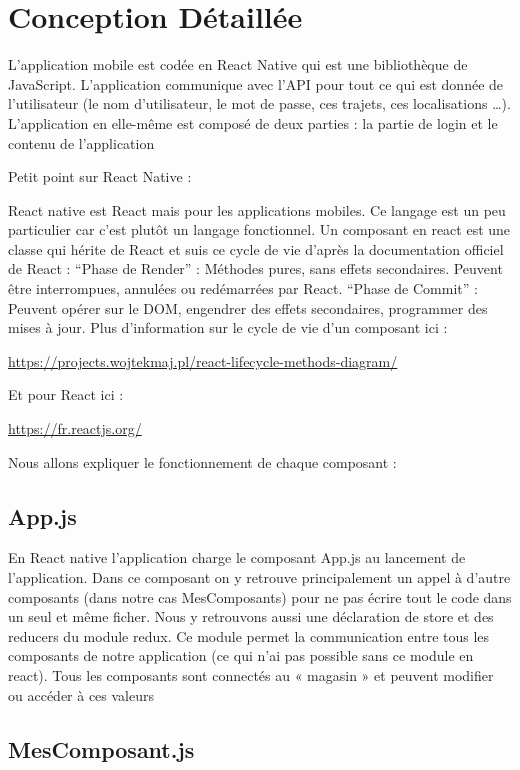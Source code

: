 \chapter{Conception Détaillée}

L’application mobile est codée en React Native qui est une bibliothèque de JavaScript. L’application communique avec l’API pour tout ce qui est donnée de l’utilisateur (le nom d’utilisateur, le mot de passe, ces trajets, ces localisations …). L’application en elle-même est composé de deux parties : la partie de login et le contenu de l’application

Petit point sur React Native :

React native est React mais pour les applications mobiles. Ce langage est un peu particulier car c’est plutôt un langage fonctionnel. Un composant en react est une classe qui hérite de React et suis ce cycle de vie d’après la documentation officiel de React  :
“Phase de Render” : Méthodes pures, sans effets secondaires. Peuvent être interrompues, annulées ou redémarrées par React.
“Phase de Commit” : Peuvent opérer sur le DOM, engendrer des effets secondaires, programmer des mises à jour.
Plus d’information sur le cycle de vie d’un composant ici :

\url{https://projects.wojtekmaj.pl/react-lifecycle-methods-diagram/}

Et pour React ici :

\url{https://fr.reactjs.org/}


Nous allons expliquer le fonctionnement de chaque composant :


\section{App.js}

En React native l’application charge le composant App.js au lancement de l’application. Dans ce composant on y retrouve principalement un appel à d’autre composants (dans notre cas MesComposants) pour ne pas écrire tout le code dans un seul et même ficher. Nous y retrouvons aussi une déclaration de store et des reducers du module redux. Ce module permet la communication entre tous les composants de notre application (ce qui n’ai pas possible sans ce module en react). Tous les composants sont connectés au « magasin » et peuvent modifier ou accéder à ces valeurs


\section{MesComposant.js}


